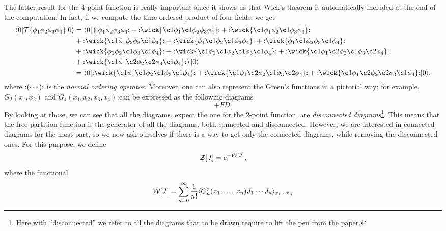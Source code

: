 The latter result for the 4-point function is really important since it shows us that Wick's theorem is automatically included at the end of the computation. In fact, if we compute the time ordered product of four fields, we get 
\begin{equation}
    \begin{split}
        \mybrakett{0}{\TO{\phi_1\phi_2\phi_3\phi_4}}{0} &= \bo (\NO{\phi_1\phi_2\phi_3\phi_4} + \NO{\wick{\c1 \phi_1 \c1 \phi_2\phi_3\phi_4}} + \NO{\wick{\c1 \phi_1\phi_2 \c1 \phi_3\phi_4}} \\
        &+ \NO{\wick{\c1 \phi_1\phi_2\phi_3 \c1 \phi_4}} + \NO{\wick{\phi_1 \c1 \phi_2 \c1 \phi_3\phi_4}} + \NO{\wick{\phi_1 \c1 \phi_2\phi_3 \c1 \phi_4}} \\
        &+ \NO{\wick{\phi_1\phi_2 \c1 \phi_3 \c1 \phi_4}} + \NO{\wick{\c1 \phi_1 \c1 \phi_2 \c1 \phi_3 \c1 \phi_4}} + \NO{\wick{\c1 \phi_1 \c2 \phi_2 \c1 \phi_3 \c2 \phi_4}} \\
        &+ \NO{\wick{\c1 \phi_1 \c2 \phi_2 \c2 \phi_3 \c1 \phi_4}}) \ko \\
        &= \mybrakett{0}{\NO{\wick{\c1 \phi_1 \c1 \phi_2 \c1 \phi_3 \c1 \phi_4}} + \NO{\wick{\c1 \phi_1 \c2 \phi_2 \c1 \phi_3 \c2 \phi_4}} + \NO{\wick{\c1 \phi_1 \c2 \phi_2 \c2 \phi_3 \c1 \phi_4}}}{0},
    \end{split}
\end{equation}
where ${:}(\cdots){:}$ is the \emph{normal ordering operator}. Moreover, one can also represent the Green's functions in a pictorial way; for example, $G_2(x_1,x_2)$ and $G_4(x_1,x_2,x_3,x_4)$ can be expressed as the following diagrams
\begin{equation}
    +FD.
\end{equation}
By looking at those, we can see that all the diagrams, expect the one for the 2-point function, are \emph{disconnected diagrams}\footnote{Here with ``disconnected'' we refer to all the diagrams that to be drawn require to lift the pen from the paper.}. This means that the free partition function is the generator of all the diagrams, both connected and disconnected. However, we are interested in connected diagrams for the most part, so we now ask ourselves if there is a way to get only the connected diagrams, while removing the disconnected ones. For this purpose, we define 
\begin{equation}
    \mathcal{Z}[J] = e^{-\mathcal{W}[J]},
\end{equation}
where the functional
\begin{equation}
    \mathcal{W}[J] = \sum_{n=0}^\infty\frac{1}{n!}\langle G^{\mathrm{c}}_n(x_1,\dots,x_n)J_1\cdots J_n \rangle_{x_1\cdots x_n}
\end{equation}
